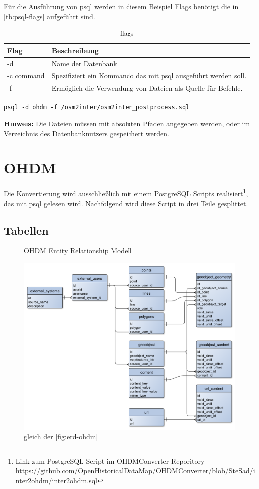 Für die Ausführung von psql werden in diesem Beispiel Flags benötigt die in \autoref{tb:psql-flags} aufgeführt sind.
\begin{table}[h]
	\caption{flags}
	\label{tb:psql-flags}
	\renewcommand{\arraystretch}{1.5}
	\begin{tabularx}{\linewidth}{|l|X|}\hline
		Flag & Beschreibung\\\hline
		-d & Name der Datenbank \\\hline
		-c command & Spezifiziert ein Kommando das mit psql ausgeführt werden soll. \\\hline
		-f & Ermöglich die Verwendung von Dateien als Quelle für Befehle.\\\hline
	\end{tabularx}\vspace{0.5cm}
\end{table}
\begin{lstlisting}[language={}]
	psql -d ohdm -f /osm2inter/osm2inter_postprocess.sql
\end{lstlisting}
\textbf{Hinweis:} Die Dateien müssen mit absoluten Pfaden angegeben werden, oder im Verzeichnis des Datenbanknutzers gespeichert werden.\\

\chapter{OHDM}
Die Konvertierung wird ausschließlich mit einem PostgreSQL Scripts realisiert\footnote{Link zum PostgreSQL Script im OHDMConverter Reporitory\\ \url{https://github.com/OpenHistoricalDataMap/OHDMConverter/blob/SteSad/inter2ohdm/inter2ohdm.sql}}, das mit psql\cite{postgres-psql} gelesen wird. Nachfolgend wird diese Script in drei Teile gesplittet.

\section{Tabellen}
\begin{figure}[h]
	\caption{OHDM Entity Relationship Modell}
	\label{fig:ohdm-erd}
	\includegraphics[width=\linewidth]{img/ohdm-db-erd.pdf}
	\caption*{gleich der \autoref{fig:erd-ohdm}}
\end{figure}

